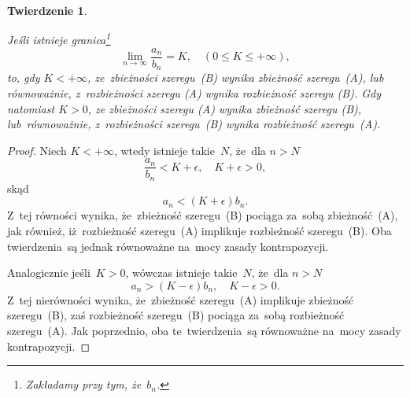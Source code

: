 \documentclass[a4paper,11pt]{article}
\newtheorem{theorem}{Twierdzenie}  %
\begin{document}
\begin{theorem}
  \label{thm:FichtenholzVolII-02}

  Jeśli istnieje granica\footnote{Zakładamy przy tym, że~$b_{ n }$.}
  \begin{equation}
    \label{eq:FichtenholzVolII-12}
    \lim\limits_{ n \to \infty } \frac{ a_{ n } }{ b_{ n } } = K, \quad
    ( 0 \leq K \leq +\infty ),
  \end{equation}
  to, gdy $K < +\infty$, ze~zbieżności szeregu~(B) wynika zbieżność
  szeregu~(A), lub równoważnie, z~rozbieżności szeregu (A) wynika
  rozbieżność szeregu (B). Gdy natomiast $K > 0$, ze zbieżności
  szeregu (A) wynika zbieżność szeregu (B), lub~równoważnie,
  z~rozbieżności szeregu~(B) wynika rozbieżność szeregu~(A).

\end{theorem}



\begin{proof}
  Niech $K < +\infty$, wtedy istnieje takie~$N$, że~dla $n > N$
  \begin{equation}
    \label{eq:FichtenholzVolII-13}
    \frac{ a_{ n } }{ b_{ n } } < K + \epsilon, \quad
    K + \epsilon > 0,
  \end{equation}
  skąd
  \begin{equation}
    \label{eq:FichtenholzVolII-14}
    a_{ n } < ( K + \epsilon ) b_{ n }.
  \end{equation}
  Z~tej równości wynika, że~zbieżność szeregu~(B) pociąga za~sobą
  zbieżność~(A), jak również, iż~rozbieżność szeregu~(A) implikuje
  rozbieżność szeregu~(B). Oba twierdzenia~są jednak równoważne
  na~mocy zasady kontrapozycji.

  Analogicznie jeśli~$K > 0$, wówczas istnieje takie~$N$, że~dla
  $n > N$
  \begin{equation}
    \label{eq:FichtenholzVolII-15}
    a_{ n } > ( K - \epsilon ) b_{ n }, \quad
    K - \epsilon > 0.
  \end{equation}
  Z~tej nierówności wynika, że~zbieżność szeregu~(A) implikuje
  zbieżność szeregu~(B), zaś rozbieżność szeregu~(B) pociąga za~sobą
  rozbieżność szeregu~(A). Jak poprzednio, oba te~twierdzenia~są
  równoważne na~mocy zasady kontrapozycji.

\end{proof}


\vspace{\spaceFour}
\end{document}
